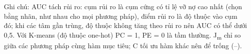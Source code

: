 {\scriptsize\noindent Ghi chú: AUC tách rủi ro: cụm rủi ro là cụm cứng có tỉ lệ vỡ nợ cao nhất (chọn bằng nhãn, như nhau cho mọi phương pháp), điểm rủi ro là độ thuộc vào cụm đó; khi các tâm gần trùng, độ thuộc không tăng theo rủi ro nên AUC có thể dưới 0,5. Với K-means (độ thuộc one-hot) PC = 1, PE = 0 là tầm thường. J\textsubscript{m} chỉ so giữa các phương pháp cùng hàm mục tiêu; C tối ưu hàm khác nên để trống (--).\par}

